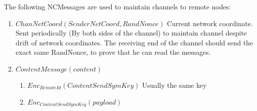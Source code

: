 \documentclass{amsart}
\theoremstyle{definition}
\theoremstyle{remark}
\numberwithin{equation}{section}
\begin{document}
The following NCMessages are used to maintain channels to remote nodes:

\begin{enumerate}
  \item $ChanNetCoord(SenderNetCoord, RandNonce)$ Current network coordinate. Sent
    periodically (By both sides of the channel) to maintain channel despite
    drift of network coordinates. The receiving end of the channel should send
    the exact same RandNonce, to prove that he can read the messages.

  \item $ContentMessage(content)$
    \begin{enumerate}
      \item $Enc_{RemoteId}(ContentSendSymKey)$ Usually the same key
      \item $Enc_{ContentSendSymKey}(payload)$
    \end{enumerate}

\end{enumerate}







\end{document}
